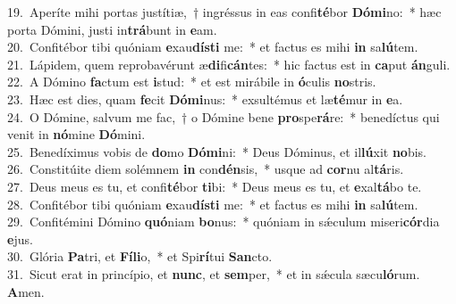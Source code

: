 {19.~}Aperíte mihi portas justítiæ,~† ingréssus in eas confi\textbf{té}bor \textbf{Dó}\textbf{mi}no:~* hæc porta Dómini, justi in\textbf{trá}bunt in \textbf{e}am.\\
{20.~}Confitébor tibi quóniam \textbf{e}xau\textbf{dí}\textbf{sti} me:~* et factus es mihi \textbf{in} sa\textbf{lú}tem.\\
{21.~}Lápidem, quem reprobavérunt æ\textbf{di}fi\textbf{cán}tes:~* hic factus est in \textbf{ca}put \textbf{án}guli.\\
{22.~}A Dómino \textbf{fa}ctum est \textbf{i}stud:~* et est mirábile in \textbf{ó}culis \textbf{no}stris.\\
{23.~}Hæc est dies, quam \textbf{fe}cit \textbf{Dó}\textbf{mi}nus:~* exsultémus et læ\textbf{té}mur in \textbf{e}a.\\
{24.~}O Dómine, salvum me fac,~† o Dómine bene \textbf{pro}spe\textbf{rá}re:~* benedíctus qui venit in \textbf{nó}mine \textbf{Dó}mini.\\
{25.~}Benedíximus vobis de \textbf{do}mo \textbf{Dó}\textbf{mi}ni:~* Deus Dóminus, et il\textbf{lú}xit \textbf{no}bis.\\
{26.~}Constitúite diem solémnem \textbf{in} con\textbf{dén}sis,~* usque ad \textbf{cor}nu al\textbf{tá}ris.\\
{27.~}Deus meus es tu, et confi\textbf{té}bor \textbf{ti}bi:~* Deus meus es tu, et \textbf{e}xal\textbf{tá}bo te.\\
{28.~}Confitébor tibi quóniam \textbf{e}xau\textbf{dí}\textbf{sti} me:~* et factus es mihi \textbf{in} sa\textbf{lú}tem.\\
{29.~}Confitémini Dómino \textbf{quó}niam \textbf{bo}nus:~* quóniam in sǽculum miseri\textbf{cór}dia \textbf{e}jus.\\
{30.~}Glória \textbf{Pa}tri, et \textbf{Fí}\textbf{li}o,~* et Spi\textbf{rí}tui \textbf{San}cto.\\
{31.~}Sicut erat in princípio, et \textbf{nunc}, et \textbf{sem}per,~* et in sǽcula sæcu\textbf{ló}rum. \textbf{A}men.\\
